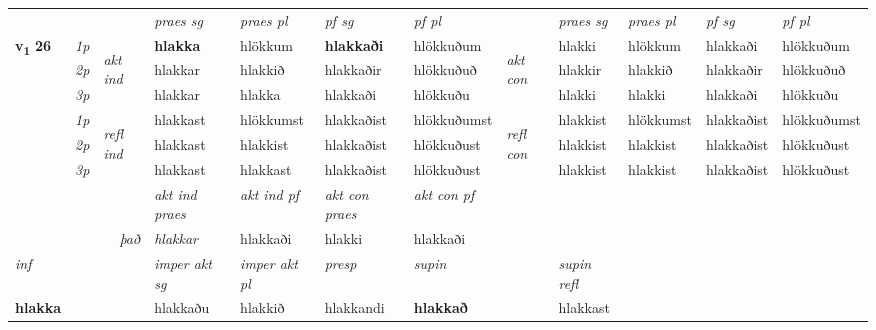 \begin{longtable}[l]{X>{\footnotesize\itshape}llXXXXlXXXX}
\midrule

 & &   & \textit{praes sg}  & \textit{praes pl}    & \textit{ pf sg} & \textit{pf pl} & & \textit{praes sg}  & \textit{praes pl}    & \textit{pf sg} & \textit{pf pl }  \\ \cmidrule{4-7} \cmidrule{9-12}
 \multirow{2}{*}{{{\textbf{v{\textsubscript{1}}} \Large{\textbf{26}}}}}  & 1p & \multirow{3}{*}{\begin{turn}{90}\textit{akt ind}\end{turn}} & \textbf{hlakka} & hlökkum & \textbf{hlakkaði} & hlökkuðum & \multirow{3}{*}{\begin{turn}{90}\textit{akt con}\end{turn}} &hlakki & hlökkum & hlakkaði & hlökkuðum\\*
 & 2p &  &  hlakkar  & hlakkið & hlakkaðir & hlökkuðuð & & hlakkir & hlakkið & hlakkaðir & hlökkuðuð \\*
 & 3p &  & hlakkar & hlakka & hlakkaði & hlökkuðu & & hlakki & hlakki& hlakkaði & hlökkuðu \\*
\cmidrule{4-7} \cmidrule{9-12}
 & 1p & \multirow{3}{*}{\begin{turn}{90}\textit{refl ind}\end{turn}}  & hlakkast & hlökkumst & hlakkaðist & hlökkuðumst & \multirow{3}{*}{\begin{turn}{90}\textit{refl con}\end{turn}}  &hlakkist & hlökkumst & hlakkaðist & hlökkuðumst \\*
 & 2p &  & hlakkast & hlakkist & hlakkaðist & hlökkuðust & &hlakkist & hlakkist & hlakkaðist & hlökkuðust \\*
 & 3p  & & hlakkast & hlakkast & hlakkaðist & hlökkuðust & & hlakkist & hlakkist& hlakkaðist & hlökkuðust \\*
\cmidrule{4-7} \cmidrule{9-12}

   && &  \textit{akt ind praes} & \textit{akt ind pf} & \textit{akt con praes} & \textit{akt con pf} \\*
\multicolumn{3}{r}{\textit{það}} & hlakkar & hlakkaði & hlakki & hlakkaði \\*

\cmidrule{4-7}
   {\textit{inf}} & &  & \textit{imper akt sg} & \textit{imper akt pl}   & \textit{presp} & \textit{supin} && \textit{supin refl}  \\*
  {\textbf{hlakka}} & && hlakkaðu  & hlakkið   & hlakkandi &  \textbf{hlakkað} && hlakkast  \\*

\midrule


\end{longtable}

